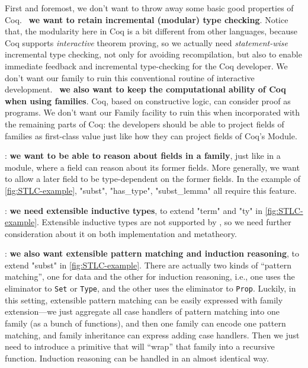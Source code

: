 First and foremost, we don't want to throw away some basic good
properties of Coq. ~\textbf{we
want to retain incremental (modular) type checking}. Notice that, the
modularity here in Coq is a bit different from other languages, because
Coq supports \textit{interactive} theorem proving, so we actually need
\textit{statement-wise} incremental type checking, not only for avoiding
re\-compilation, but also to enable immediate feedback and incremental
type-checking for the Coq developer. We don't want our family to ruin
this conventional routine of interactive development.
~\textbf{we also want to keep the
computational ability of Coq when using families}. Coq, based on constructive
logic, can consider proof as programs. 
We don't want our Family facility to ruin this when incorporated with 
the remaining parts of Coq: 
the developers should be able to project fields of families 
as first-class value just like how they can project fields of Coq's Module.

:\textbf{ we want to be able to
reason about fields in a family}, just like in a module, where a field
can reason about its former fields. More generally, we want to allow a
later field to be type-dependent on the former fields. In the example of
\cref{fig:STLC-example}, "subst", "has_type", "subst_lemma" all require
this feature.

:\textbf{ we need extensible
inductive types}, to extend "term" and "ty" in \cref{fig:STLC-example}.
Extensible inductive types are not supported by \citet{zm2017}, so
we need further consideration about it on both implementation and
metatheory.

: \textbf{we also want extensible
pattern matching and induction reasoning}, to extend "subst" in
\cref{fig:STLC-example}.
There are actually two kinds of ``pattern matching'', one for data and
the other for induction reasoning, i.e., one uses the eliminator to
\texttt{Set} or \texttt{Type}, and the other uses the
eliminator to \texttt{Prop}. Luckily, in this setting,
extensible pattern matching can be easily expressed with family
extension---we just aggregate all case handlers of pattern matching
into one family (as a bunch of functions), and then one family can
encode one pattern matching, and family inheritance can express adding
case handlers. Then we just need to introduce a primitive that will
``wrap'' that family into a recursive function. Induction reasoning can
be handled in an almost identical way. 

